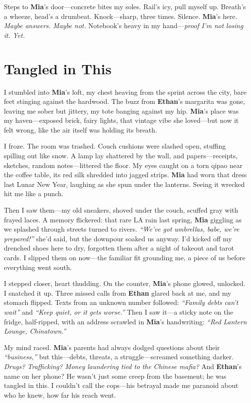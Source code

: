 \documentclass{article}
\begin{document}
Steps to \textbf{Mia}’s door—concrete bites my soles. Rail’s icy, pull myself up. Breath’s a wheeze, head’s a drumbeat. Knock—sharp, three times. Silence. \textbf{Mia}’s here. \textit{Maybe answers. Maybe not.} Notebook’s heavy in my hand—\textit{proof I’m not losing it. Yet.}

\section*{Tangled in This}

I stumbled into \textbf{Mia}’s loft, my chest heaving from the sprint across the city, bare feet stinging against the hardwood. The buzz from \textbf{Ethan}’s margarita was gone, leaving me sober but jittery, my tote banging against my hip. \textbf{Mia}’s place was my haven—exposed brick, fairy lights, that vintage vibe she loved—but now it felt wrong, like the air itself was holding its breath.

I froze. The room was trashed. Couch cushions were slashed open, stuffing spilling out like snow. A lamp lay shattered by the wall, and papers—receipts, sketches, random notes—littered the floor. My eyes caught on a torn qipao near the coffee table, its red silk shredded into jagged strips. \textbf{Mia} had worn that dress last Lunar New Year, laughing as she spun under the lanterns. Seeing it wrecked hit me like a punch.

Then I saw them—my old sneakers, shoved under the couch, scuffed gray with frayed laces. A memory flickered: that rare LA rain last spring, \textbf{Mia} giggling as we splashed through streets turned to rivers. \textit{“We’ve got umbrellas, babe, we’re prepared!”} she’d said, but the downpour soaked us anyway. I’d kicked off my drenched shoes here to dry, forgotten them after a night of takeout and tarot cards. I slipped them on now—the familiar fit grounding me, a piece of us before everything went south.

I stepped closer, heart thudding. On the counter, \textbf{Mia}’s phone glowed, unlocked. I snatched it up. Three missed calls from \textbf{Ethan} glared back at me, and my stomach flipped. Texts from an unknown number followed: \textit{“Family debts can’t wait”} and \textit{“Keep quiet, or it gets worse.”} Then I saw it—a sticky note on the fridge, half-ripped, with an address scrawled in \textbf{Mia}’s handwriting: \textit{“Red Lantern Lounge, Chinatown.”}

My mind raced. \textbf{Mia}’s parents had always dodged questions about their \textit{“business,”} but this—debts, threats, a struggle—screamed something darker. \textit{Drugs? Trafficking? Money laundering tied to the Chinese mafia?} And \textbf{Ethan}’s name on her phone? He wasn’t just some creep from the basement; he was tangled in this. I couldn’t call the cops—his betrayal made me paranoid about who he knew, how far his reach went.
\end{document}
